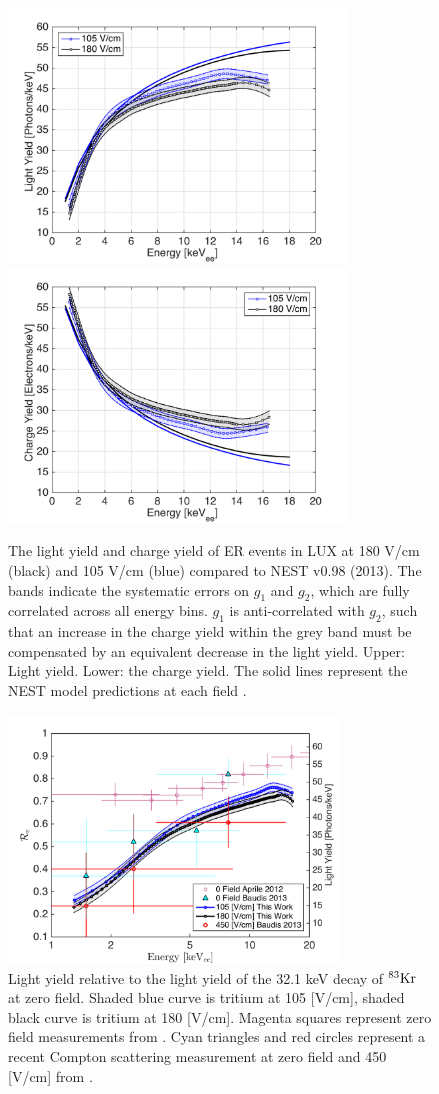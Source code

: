 \begin{figure}[h!]\centering
\includegraphics[width=90mm]{fig/ER_LY.png}
\includegraphics[width=90mm]{fig/ER_QY.png}
\caption{The light yield and charge yield of ER events in LUX at 180 V/cm (black) and 105 V/cm (blue) compared to NEST v0.98 (2013). The bands indicate the systematic errors on $g_1$ and $g_2$, which are fully correlated across all energy bins. $g_1$ is anti-correlated with $g_2$, such that an increase in the charge yield within the grey band must be compensated by an equivalent decrease in the light yield. Upper: Light yield. Lower: the charge yield. The solid lines represent the NEST model predictions at each field \cite{NEST_2013}.}
\label{fig:ER-LY-QY}
\end{figure}

 \begin{figure}[h!]\centering
\includegraphics[width=88mm]{fig/Re_LY_log.png}
\caption{Light yield relative to the light yield of the 32.1 keV decay of $\rm^{83}Kr $ at zero field. Shaded blue curve is tritium at 105 [V/cm], shaded black curve is tritium at 180 [V/cm]. Magenta squares represent zero field measurements from \cite{Aprile_LY}. Cyan triangles and red circles represent a recent Compton scattering measurement at zero field and 450 [V/cm] from \cite{Baudis}. }
\label{fig:Re_LY}
\end{figure}


